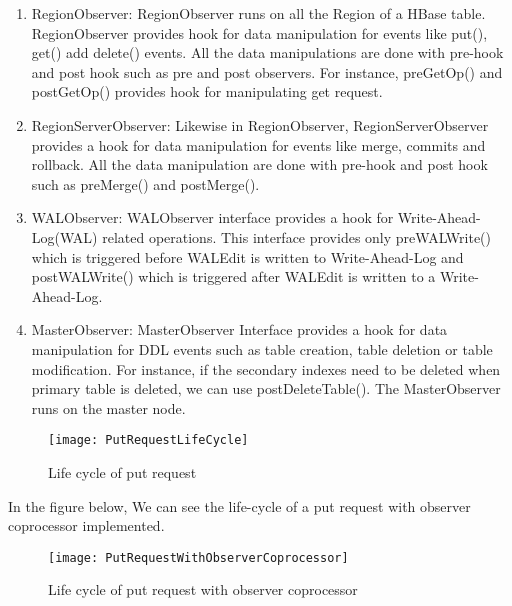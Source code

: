 \documentclass[11pt,a4paper,bibtotoc,idxtotoc,headsepline,footsepline,footexclude,BCOR12mm,DIV13]{scrbook}
\begin{document}
\begin{enumerate}
    
\item RegionObserver: RegionObserver runs on all the Region of a HBase table. RegionObserver provides hook for data manipulation for events like put(), get() add delete() events. All the data manipulations are done with pre-hook and post hook\cite{hbase:essential} such as pre and post observers. For instance, preGetOp() and postGetOp() provides hook for manipulating get request. 

\item RegionServerObserver: Likewise in RegionObserver, RegionServerObserver provides a hook for data manipulation for events like merge, commits and rollback. All the data manipulation are done with pre-hook and post hook such as preMerge() and postMerge(). 

\item WALObserver: WALObserver interface provides a hook for Write-Ahead-Log(WAL)\cite{hbase:essential} related operations. This interface provides only preWALWrite() which is triggered before WALEdit is written to Write-Ahead-Log and postWALWrite() which is triggered after WALEdit is written to a Write-Ahead-Log.

\item MasterObserver: MasterObserver Interface provides a hook for data manipulation for DDL events such as table creation, table deletion or table modification\cite{cloudera:instandupg}. For instance, if the secondary indexes need to be deleted when primary table is deleted, we can use postDeleteTable(). The MasterObserver runs on the master node.

\end{enumerate}

\begin{figure}
    \centering
    \texttt{[image: PutRequestLifeCycle]}
    \caption{Life cycle of put request}
    
\end{figure}

In the figure below, We can see the life-cycle of a put request with observer coprocessor implemented.

\begin{figure}
    \centering
    \texttt{[image: PutRequestWithObserverCoprocessor]}
    \caption{Life cycle of put request with observer coprocessor}
    
\end{figure}
\end{document}
